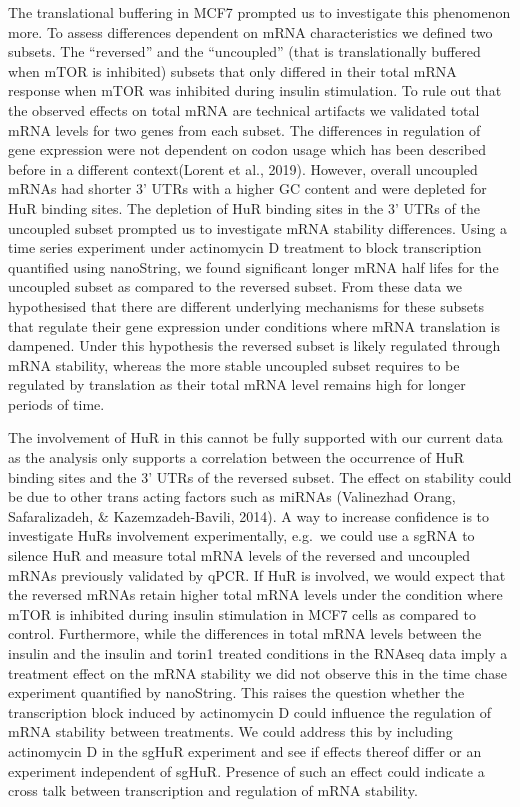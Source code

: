 \documentclass[
  12pt,
  openany]{book}
\begin{document}
The translational buffering in MCF7 prompted us to investigate this phenomenon more. To assess differences dependent on mRNA characteristics we defined two subsets. The ``reversed'' and the ``uncoupled'' (that is translationally buffered when mTOR is inhibited) subsets that only differed in their total mRNA response when mTOR was inhibited during insulin stimulation. To rule out that the observed effects on total mRNA are technical artifacts we validated total mRNA levels for two genes from each subset. The differences in regulation of gene expression were not dependent on codon usage which has been described before in a different context(Lorent et al., 2019). However, overall uncoupled mRNAs had shorter 3' UTRs with a higher GC content and were depleted for HuR binding sites. The depletion of HuR binding sites in the 3' UTRs of the uncoupled subset prompted us to investigate mRNA stability differences. Using a time series experiment under actinomycin D treatment to block transcription quantified using nanoString, we found significant longer mRNA half lifes for the uncoupled subset as compared to the reversed subset. From these data we hypothesised that there are different underlying mechanisms for these subsets that regulate their gene expression under conditions where mRNA translation is dampened. Under this hypothesis the reversed subset is likely regulated through mRNA stability, whereas the more stable uncoupled subset requires to be regulated by translation as their total mRNA level remains high for longer periods of time.

The involvement of HuR in this cannot be fully supported with our current data as the analysis only supports a correlation between the occurrence of HuR binding sites and the 3' UTRs of the reversed subset. The effect on stability could be due to other trans acting factors such as miRNAs (Valinezhad Orang, Safaralizadeh, \& Kazemzadeh-Bavili, 2014). A way to increase confidence is to investigate HuRs involvement experimentally, e.g.~we could use a sgRNA to silence HuR and measure total mRNA levels of the reversed and uncoupled mRNAs previously validated by qPCR. If HuR is involved, we would expect that the reversed mRNAs retain higher total mRNA levels under the condition where mTOR is inhibited during insulin stimulation in MCF7 cells as compared to control. Furthermore, while the differences in total mRNA levels between the insulin and the insulin and torin1 treated conditions in the RNAseq data imply a treatment effect on the mRNA stability we did not observe this in the time chase experiment quantified by nanoString. This raises the question whether the transcription block induced by actinomycin D could influence the regulation of mRNA stability between treatments. We could address this by including actinomycin D in the sgHuR experiment and see if effects thereof differ or an experiment independent of sgHuR. Presence of such an effect could indicate a cross talk between transcription and regulation of mRNA stability.
\end{document}
